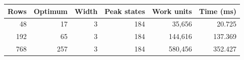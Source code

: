 \begin{tabular}{rrrrrr}
\toprule
Rows & Optimum & Width & Peak states & Work units & Time (ms)\\
\midrule
48 & 17 & 3 & 184 & 35,656 & 20.725\\
192 & 65 & 3 & 184 & 144,616 & 137.369\\
768 & 257 & 3 & 184 & 580,456 & 352.427\\
\bottomrule
\end{tabular}
